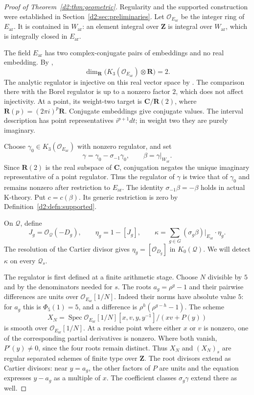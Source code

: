 \documentclass[11pt,a4paper]{amsart}
\numberwithin{equation}{section}
\theoremstyle{definition}
\theoremstyle{remark}
\newcommand{\DtwoZZ}{\mathbf{Z}}
\newcommand{\DtwoRR}{\mathbf{R}}
\newcommand{\DtwoCC}{\mathbf{C}}
\newcommand{\DtwocO}{\mathcal O}
\newcommand{\DtwocQ}{\mathcal Q}
\newcommand{\Dtwoar}{\mathrm{ar}}
\newcommand{\DtwoSpec}{\operatorname{Spec}}
\begin{document}
\begin{proof}[Proof of Theorem~\ref{d2:thm:geometric}]
Regularity and the supported construction were established in
Section~\ref{d2:sec:preliminaries}.
Let \(\DtwocO_{E_{\Dtwoar}}\) be the integer ring of \(E_{\Dtwoar}\).
It is contained in \(W_{\Dtwoar}\): an element integral over \(\DtwoZZ\)
is integral over \(W_{\Dtwoar}\), which is integrally closed in
\(E_{\Dtwoar}\).

The field \(E_{\Dtwoar}\) has two complex-conjugate pairs of embeddings
and no real embedding. By \cite[Proposition~12.2]{Borel},
\[
 \dim_\DtwoRR\bigl(K_3(\DtwocO_{E_{\Dtwoar}})\otimes\DtwoRR\bigr)=2.
\]
The analytic regulator is injective on this real vector space by
\cite[Section~6, especially~(6.4)]{BunkeTamme}.
The comparison there with the Borel regulator is up to a nonzero
factor \(2\), which does not affect injectivity.
At a point, its weight-two target is \(\DtwoCC/\DtwoRR(2)\), where
\(\DtwoRR(p)=(2\pi i)^p\DtwoRR\).
Conjugate embeddings give conjugate values.
The interval description has point representatives
\(i^{p+1}dt\); in weight two they are purely imaginary.

Choose \(\gamma_0\in K_3(\DtwocO_{E_{\Dtwoar}})\) with nonzero regulator,
and set
\[
 \gamma=\gamma_0-\sigma_{-1}\gamma_0,\qquad
 \beta=\gamma|_{W_{\Dtwoar}}.
\]
Since \(\DtwoRR(2)\) is the real subspace of \(\DtwoCC\), conjugation negates
the unique imaginary representative of a point regulator.
Thus the regulator of \(\gamma\) is twice that of \(\gamma_0\)
and remains nonzero after restriction to \(E_{\Dtwoar}\).
The identity \(\sigma_{-1}\beta=-\beta\) holds in actual K-theory.
Put \(c=c(\beta)\).
Its generic restriction is zero by Definition~\ref{d2:defn:supported}.

On \(\DtwocQ\), define
\[
 J_g=\DtwocO_{\DtwocQ}(-D_g),\qquad
 \eta_g=1-[J_g],\qquad
 \kappa=\sum_{g\in G}(\sigma_g\beta)|_{E_{\Dtwoar}}\cdot\eta_g.
\]
The resolution of the Cartier divisor gives
\(\eta_g=[\DtwocO_{D_g}]\) in \(K_0(\DtwocQ)\).
We will detect \(\kappa\) on every \(\DtwocQ_s\).

The regulator is first defined at a finite arithmetic stage.
Choose \(N\) divisible by \(5\) and by the denominators needed for
\(s\). The roots \(a_g=\rho^g-1\) and their pairwise differences are
units over \(\DtwocO_{E_{\Dtwoar}}[1/N]\).
Indeed their norms have absolute value \(5\):
for \(a_g\) this is \(\Phi_5(1)=5\), and a difference is
\(\rho^h(\rho^{g-h}-1)\).
The scheme
\[
 X_N=\DtwoSpec
 \DtwocO_{E_{\Dtwoar}}[1/N][x,v,y,y^{-1}]/(xv+P(y))
\]
is smooth over \(\DtwocO_{E_{\Dtwoar}}[1/N]\).
At a residue point where either \(x\) or \(v\) is nonzero, one of the
corresponding partial derivatives is nonzero.
Where both vanish, \(P'(y)\ne0\), since the four roots remain distinct.
Thus \(X_N\) and \((X_N)_s\) are regular separated schemes of finite
type over \(\DtwoZZ\).
The root divisors extend as Cartier divisors: near \(y=a_g\), the
other factors of \(P\) are units and the equation expresses
\(y-a_g\) as a multiple of \(x\).
The coefficient classes \(\sigma_g\gamma\) extend there as well.


\end{proof}
\end{document}

